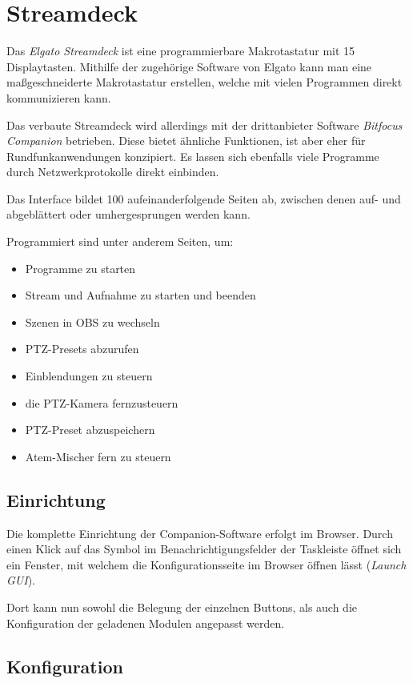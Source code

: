 \chapter{Streamdeck}
	Das \textit{Elgato Streamdeck} ist eine programmierbare Makrotastatur mit 15 Displaytasten. Mithilfe der zugehörige Software von Elgato kann man eine maßgeschneiderte Makrotastatur erstellen, welche mit vielen Programmen direkt kommunizieren kann.

	Das verbaute Streamdeck wird allerdings mit der drittanbieter Software \textit{Bitfocus Companion} betrieben. Diese bietet ähnliche Funktionen, ist aber eher für Rundfunkanwendungen konzipiert. Es lassen sich ebenfalls viele Programme durch Netzwerkprotokolle direkt einbinden.

	Das Interface bildet 100 aufeinanderfolgende Seiten ab, zwischen denen auf- und abgeblättert oder umhergesprungen werden kann.

	Programmiert sind unter anderem Seiten, um:
	\begin{itemize}
		\item Programme zu starten
		\item Stream und Aufnahme zu starten und beenden
		\item Szenen in \Gls{OBS} zu wechseln
		\item PTZ-Presets abzurufen
		\item Einblendungen zu steuern
		\item die \Gls{PTZ-Kamera} fernzusteuern
		\item PTZ-Preset abzuspeichern
		\item Atem-Mischer fern zu steuern
	\end{itemize}

	\section{Einrichtung}
		Die komplette Einrichtung der Companion-Software erfolgt im Browser. Durch einen Klick auf das Symbol im Benachrichtigungsfelder der Taskleiste öffnet sich ein Fenster, mit welchem die Konfigurationsseite im Browser öffnen lässt (\textit{Launch GUI}).

		Dort kann nun sowohl die Belegung der einzelnen Buttons, als auch die Konfiguration der geladenen Modulen angepasst werden.

	\section{Konfiguration}

